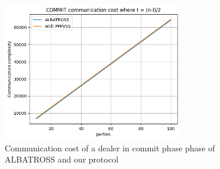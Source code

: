 \begin{figure}[htbp]
  \centering
  \includegraphics[width=0.7\textwidth]{figures/commit_comm.png}
  \caption{Communication cost of a dealer in commit phase phase of ALBATROSS and our protocol}
  \label{fig:dealer_commit_comm}
\end{figure}